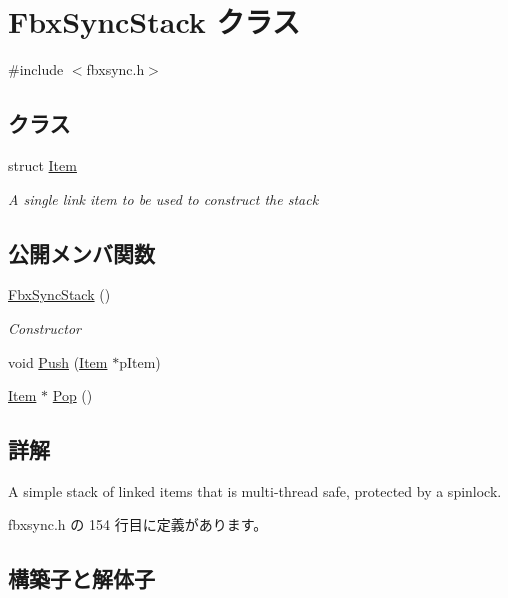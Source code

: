 \hypertarget{class_fbx_sync_stack}{}\section{Fbx\+Sync\+Stack クラス}
\label{class_fbx_sync_stack}


{\ttfamily \#include $<$fbxsync.\+h$>$}

\subsection*{クラス}
\begin{DoxyCompactItemize}
\item 
struct \hyperlink{struct_fbx_sync_stack_1_1_item}{Item}
\begin{DoxyCompactList}\small\item\em A single link item to be used to construct the stack \end{DoxyCompactList}\end{DoxyCompactItemize}
\subsection*{公開メンバ関数}
\begin{DoxyCompactItemize}
\item 
\hyperlink{class_fbx_sync_stack_a39058f505817e4a4739323b3daa8fafe}{Fbx\+Sync\+Stack} ()
\begin{DoxyCompactList}\small\item\em Constructor \end{DoxyCompactList}\item 
void \hyperlink{class_fbx_sync_stack_a1412ced243b15737a27bb4a3b30bd40b}{Push} (\hyperlink{struct_fbx_sync_stack_1_1_item}{Item} $\ast$p\+Item)
\item 
\hyperlink{struct_fbx_sync_stack_1_1_item}{Item} $\ast$ \hyperlink{class_fbx_sync_stack_a13b7a3879bf1dab796985893597d443f}{Pop} ()
\end{DoxyCompactItemize}


\subsection{詳解}
A simple stack of linked items that is multi-\/thread safe, protected by a spinlock. 

 fbxsync.\+h の 154 行目に定義があります。



\subsection{構築子と解体子}
\mbox{\label{class_fbx_sync_stack_a39058f505817e4a4739323b3daa8fafe}} 
